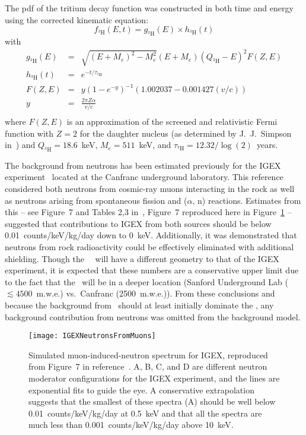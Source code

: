 The pdf of the tritium decay function was constructed in both time and energy using the corrected kinematic equation:
		\begin{equation}
			f_{^{3}\text{H}}\left(E, t\right)  =  g_{^{3}\text{H}}\left(E\right) \times h_{^{3}\text{H}}\left(t\right) 
		\end{equation}
		with
		\begin{eqnarray}
		g_{^{3}\text{H}}\left(E\right) & = & \sqrt{(E + M_e)^2 - M_e^2} \left(
			E + M_e \right) \left( Q_{^3\text{H}} - E \right)^2 F(Z, E) \\
h_{^{3}\text{H}}\left(t\right) & = & e^{-t/\tau_{^3\text{H}}} \\
		F(Z,E) & =  & y ( 1 - e^{-y} )^{-1} (1.002037 - 0.001427(v/c)) \\
		y & = & \frac{2 \pi Z \alpha}{v/c} \\
		\end{eqnarray}
		where $F(Z,E)$ is an approximation of the screened and relativistic Fermi function with $Z = 2$ for the daughter nucleus (as determined by J.~J.~Simpson in~\cite{Simp81}) and $Q_{^3\text{H}}=18.6$~keV, $M_{e}=511$~keV, and $\tau_{^3\text{H}} = 12.32 / \log(2)$~years.  
		
	The background from neutrons has been estimated previously for the IGEX experiment~\cite{Carmona2004523} located at the Canfranc underground laboratory.  This reference considered both neutrons from cosmic-ray muons interacting in the rock as well as neutrons arising from spontaneous fission and ($\alpha$, n) reactions.  Estimates from this -- see Figure~7 and Tables 2,3 in~\cite{Carmona2004523}, Figure~7 reproduced here in Figure~\ref{fig:IGEXNeutrons} -- suggested that contributions to IGEX from both sources should be below 0.01~counts/keV/kg/day down to 0~keV.  Additionally, it was demonstrated that neutrons from rock radioactivity could be effectively eliminated with additional shielding.  Though the \MJ~\minmod~will have a different geometry to that of the IGEX experiment, it is expected that these numbers are a conservative upper limit due to the fact that the \minmod~will be in a deeper location (Sanford Underground Lab ($\lesssim4500$~m.w.e.) vs.~Canfranc (2500~m.w.e.)).  From these conclusions and because the background from \hthree~should at least initially dominate the \minmod, any background contribution from neutrons was omitted from the background model.
	
			\begin{figure}
				\centering
				\texttt{[image: IGEXNeutronsFromMuons]}
				\caption[Simulated muon-induced-neutron spectrum for IGEX.]{Simulated muon-induced-neutron 
				spectrum for IGEX, reproduced from Figure~7 in reference~\cite{Carmona2004523}.  A, B, C, and D are different
				neutron moderator configurations for the IGEX experiment, and the lines are exponential fits to guide the eye.
				A conservative extrapolation suggests that the smallest of these spectra (A) 
				should be well below 0.01~counts/keV/kg/day at
				0.5~keV and that all the spectra are much less than 0.001~counts/keV/kg/day above 10~keV.}
				\label{fig:IGEXNeutrons}
			\end{figure}
	
